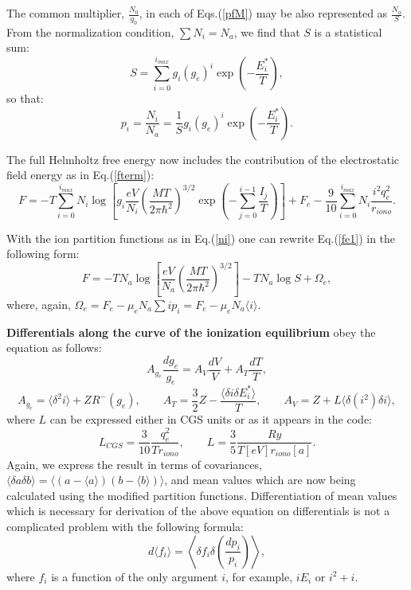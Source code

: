 The common multiplier, $\frac{N_0}{g_0}$, in each of Eqs.(\ref{pfM}) may be also represented as $\frac{N_a}{S}$.
From the normalization condition, $\sum N_i = N_a$, we find that $S$ is a statistical sum:
\begin{equation}
S=\sum_{i=0}^{i_{max}} g_i (g_e)^i \exp\left(-\frac{E_i^*}T\right),
\end{equation}
so that:
\begin{equation}\label{ni}
p_i = \frac{N_i}{N_a} = \frac{1}S g_i (g_e)^i \exp \left( -\frac{E_i^*}T \right).
\end{equation}

The full Helmholtz free energy now includes the contribution of the electrostatic field energy as in Eq.(\ref{fterm}):
\begin{equation}\label{fe1}
F=-T
\sum_{i=0}^{i_{max}}{
N_i\log\left[g_i
  \frac{eV}{N_i}\left(\frac{MT}{2\pi \hbar^2}\right)^{3/2}\exp \left(-\sum_{j=0}^{i-1}\frac{I_j}T \right)\right]}+F_e
  -\frac{9}{10} \sum_{i=0}^{i_{max}} N_i \frac{i^2 q_e^2}{r_{iono}}.
\end{equation}  

With the ion partition functions as in Eq.(\ref{ni}) one can rewrite Eq.(\ref{fe1}) in the following form:
\begin{equation}\label{ffullm}
F = -TN_a\log\left[\frac{eV}{N_a}\left(\frac{MT}{2\pi \hbar^2}\right)^{3/2}\right]-TN_a\log S + \Omega_e, 
\end{equation}
where, again, $\Omega_e = F_e - \mu_e N_a \sum i p_i = F_e - \mu_e N_a \langle i \rangle $.

{\bf Differentials along the curve of the ionization equilibrium} obey the equation as follows:
\begin{equation}\label{diffstruct}
A_{g_e} \frac{dg_e}{g_e} = A_V \frac{dV}{V} + A_T \frac{dT}{T},
\end{equation}
\begin{equation}
A_{g_e} = \langle \delta^2 i \rangle + ZR^-(g_e), \qquad
A_T     = \frac32 Z - \frac{\langle \delta i \delta E^*_i \rangle}{T}, \qquad
A_V     = Z + L \langle \delta(i^2) \delta i \rangle,
\end{equation}
where $L$ can be expressed either in CGS units or as it appears in the code:
\begin{equation}
L_{CGS}   = \frac{3}{10} \frac{q_e^2}{T r_{iono}}, \qquad
L = \frac35 \frac{Ry}{T[eV] r_{iono}[a]}.
\end{equation}
Again, we express the result in terms of covariances,
$\langle \delta a \delta b \rangle = \langle (a - \langle a \rangle) (b - \langle b \rangle) \rangle$,
and mean values which are now being calculated
using the modified partition functions.
Differentiation of mean values which is necessary for derivation of the above equation on
differentials is not a complicated problem with the following formula:
\begin{equation}
d \langle f_i \rangle = \left\langle \delta f_i \delta\left( \frac{dp_i}{p_i} \right) \right\rangle,
\end{equation}
where $f_i$ is a function of the only argument $i$, for example, $iE_i$ or $i^2+i$.

